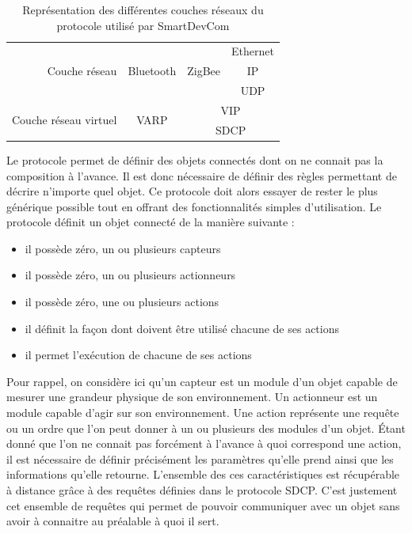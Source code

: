 		\begin{table}[!ht]
			\centering
			\begin{tabular}{r|c|c|c|}
				\cline{2-4}
				& & & Ethernet \\ \cline{4-4}
				Couche réseau & Bluetooth & ZigBee & IP \\ \cline{4-4}
				& & & UDP \\ \cline{2-4}
				\multirow{2}{*}{Couche réseau virtuel} & \multirow{2}{*}{VARP} & 
				\multicolumn{2}{c|}{VIP} \\ \cline{3-4}
				&                      & \multicolumn{2}{c|}{SDCP} \\
				\cline{2-4}
			\end{tabular}
			\caption{Représentation des différentes couches réseaux du protocole utilisé par 
					   SmartDevCom}
			\label{modeleCouche}
		\end{table}
		
		Le protocole permet de définir des objets connectés dont on ne connait pas la composition à 
		l'avance. Il est donc nécessaire de définir des règles permettant de décrire n'importe quel
		objet. Ce protocole doit alors essayer de rester le plus générique possible tout en offrant
		des fonctionnalités simples d'utilisation. Le protocole définit un objet connecté de la 
		manière suivante :
		\begin{itemize}
			\item il possède zéro, un ou plusieurs capteurs
			\item il possède zéro, un ou plusieurs actionneurs
			\item il possède zéro, une ou plusieurs actions
			\item il définit la façon dont doivent être utilisé chacune de ses actions
			\item il permet l'exécution de chacune de ses actions
		\end{itemize}
		
		Pour rappel, on considère ici qu'un capteur est un module d'un objet capable de mesurer une
		grandeur physique de son environnement. Un actionneur est un module capable d'agir sur son
		environnement. Une action représente une requête ou un ordre que l'on peut donner à un ou
		plusieurs des modules d'un objet. Étant donné que l'on ne connait pas forcément à l'avance
		à quoi correspond une action, il est nécessaire de définir précisément les paramètres qu'elle
		prend ainsi que les informations qu'elle retourne. L'ensemble des ces caractéristiques est
		récupérable à distance grâce à des requêtes définies dans le protocole SDCP. C'est justement
		cet ensemble de requêtes qui permet de pouvoir communiquer avec un objet sans avoir à connaitre au préalable à quoi il sert.
		
